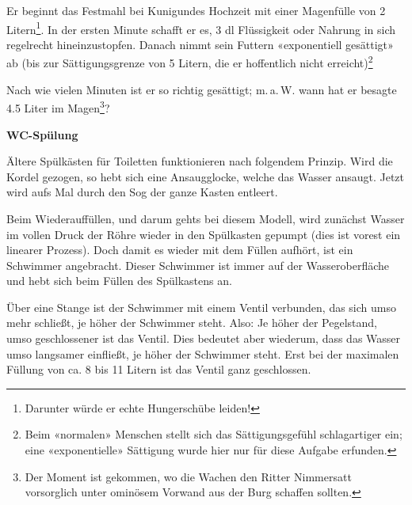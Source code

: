 Er beginnt das Festmahl bei Kunigundes Hochzeit mit einer Magenfülle
von 2 Litern\footnote{Darunter würde er echte Hungerschübe
  leiden!}. In der ersten Minute schafft er es, 3 dl Flüssigkeit oder Nahrung
in sich regelrecht hineinzustopfen. Danach nimmt sein Futtern
«exponentiell gesättigt» ab (bis zur Sättigungsgrenze von 5 Litern, die er
hoffentlich nicht erreicht)\footnote{Beim «normalen» Menschen stellt
  sich das Sättigungsgefühl schlagartiger ein; eine «exponentielle»
  Sättigung wurde hier nur für diese Aufgabe erfunden.}%

Nach wie vielen Minuten ist er so richtig gesättigt; m.\,a.\,W. wann
hat er besagte 4.5 Liter im Magen\footnote{Der Moment ist gekommen, wo
  die Wachen den Ritter Nimmersatt vorsorglich unter ominösem Vorwand aus der Burg schaffen sollten.}?

\newpage



\bbwActAufgabenNr{} \textbf{WC-Spülung}\par
Ältere Spülkästen für Toiletten funktionieren nach folgendem Prinzip.
Wird die Kordel gezogen, so hebt sich eine
Ansaugglocke, welche das Wasser ansaugt. Jetzt wird aufs Mal durch den
Sog der ganze Kasten entleert.

Beim Wiederauffüllen, und darum gehts bei diesem Modell, wird zunächst
Wasser im vollen Druck der Röhre wieder in den Spülkasten
gepumpt (dies ist vorest ein linearer Prozess). Doch damit es wieder mit dem Füllen aufhört,
ist ein Schwimmer angebracht. Dieser Schwimmer ist immer auf der
Wasseroberfläche und hebt sich beim Füllen des Spülkastens an.

Über eine Stange ist der Schwimmer
mit einem Ventil verbunden, das sich umso mehr schließt, je höher der
Schwimmer steht. Also: Je höher der Pegelstand, umso geschlossener ist
das Ventil. Dies bedeutet aber wiederum, dass das Wasser umso
langsamer einfließt, je höher der Schwimmer steht. Erst bei der
maximalen Füllung von ca. 8 bis 11 Litern ist das Ventil ganz
geschlossen. 

